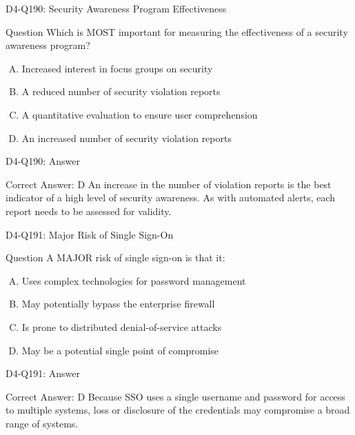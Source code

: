 \documentclass{beamer}
\begin{document}
	\begin{frame}{D4-Q190: Security Awareness Program Effectiveness}
		\begin{block}{Question}
			Which is MOST important for measuring the effectiveness of a security awareness program?
		\end{block}
		\begin{enumerate}[(A)]
			\item Increased interest in focus groups on security
			\item A reduced number of security violation reports
			\item A quantitative evaluation to ensure user comprehension
			\item An increased number of security violation reports
		\end{enumerate}
	\end{frame}
	\begin{frame}{D4-Q190: Answer}
		\begin{block}{Correct Answer: D}
			An increase in the number of violation reports is the best indicator of a high level of security awareness. As with automated alerts, each report needs to be assessed for validity.
		\end{block}
	\end{frame}
	
	\begin{frame}{D4-Q191: Major Risk of Single Sign-On}
		\begin{block}{Question}
			A MAJOR risk of single sign-on is that it:
		\end{block}
		\begin{enumerate}[(A)]
			\item Uses complex technologies for password management
			\item May potentially bypass the enterprise firewall
			\item Is prone to distributed denial-of-service attacks
			\item May be a potential single point of compromise
		\end{enumerate}
	\end{frame}
	\begin{frame}{D4-Q191: Answer}
		\begin{block}{Correct Answer: D}
			Because SSO uses a single username and password for access to multiple systems, loss or disclosure of the credentials may compromise a broad range of systems.
		\end{block}
	\end{frame}
	
\end{document}
